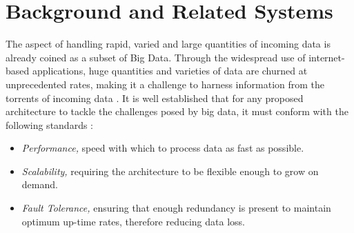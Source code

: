 \documentclass[10pt,conference]{IEEEtran}
\begin{document}
\section{Background and Related Systems}
The aspect of handling rapid, varied and large quantities of incoming data is already coined as a subset of Big Data. Through the widespread use of internet-based applications, huge quantities and varieties of data are churned at unprecedented rates, making it a challenge to harness information from the torrents of incoming data \cite{BigDataYahoo, VideoCloudPlatform}. It is well established that for any proposed architecture to tackle the challenges posed by big data, it must conform with the following standards \cite{VideoCloudPlatform, DeepIntelligenceFramework}:
\begin{itemize}
    \item \textit{Performance,} speed with which to process data as fast as possible.
    \item \textit{Scalability,} requiring the architecture to be flexible enough to grow on demand.
    \item \textit{Fault Tolerance,} ensuring that enough redundancy is present to maintain optimum up-time rates, therefore reducing data loss.
\end{itemize}
\end{document}
